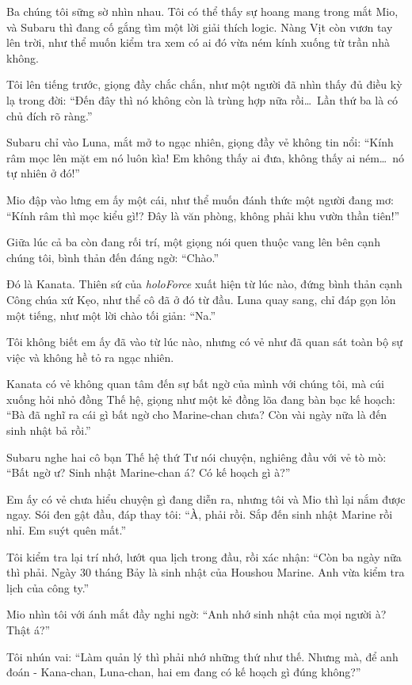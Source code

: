 \documentclass[../main.tex]{subfiles}
\begin{document}
Ba chúng tôi sững sờ nhìn nhau. Tôi có thể thấy sự hoang mang trong mắt Mio, và Subaru thì đang cố gắng tìm một lời giải thích logic. Nàng Vịt còn vươn tay lên trời, như thể muốn kiểm tra xem có ai đó vừa ném kính xuống từ trần nhà không.

Tôi lên tiếng trước, giọng đầy chắc chắn, như một người đã nhìn thấy đủ điều kỳ lạ trong đời: ``Đến đây thì nó không còn là trùng hợp nữa rồi\dots\ Lần thứ ba là có chủ đích rõ ràng.''

Subaru chỉ vào Luna, mắt mở to ngạc nhiên, giọng đầy vẻ không tin nổi: ``Kính râm mọc lên mặt em nó luôn kìa! Em không thấy ai đưa, không thấy ai ném\dots\ nó tự nhiên ở đó!''

Mio đập vào lưng em ấy một cái, như thể muốn đánh thức một người đang mơ: ``Kính râm thì mọc kiểu gì!? Đây là văn phòng, không phải khu vườn thần tiên!''

Giữa lúc cả ba còn đang rối trí, một giọng nói quen thuộc vang lên bên cạnh chúng tôi, bình thản đến đáng ngờ: ``Chào.''

Đó là Kanata. Thiên sứ của \textit{holoForce} xuất hiện từ lúc nào, đứng bình thản cạnh Công chúa xứ Kẹo, như thể cô đã ở đó từ đầu. Luna quay sang, chỉ đáp gọn lỏn một tiếng, như một lời chào tối giản: ``Na.''


Tôi không biết em ấy đã vào từ lúc nào, nhưng có vẻ như đã quan sát toàn bộ sự việc và không hề tỏ ra ngạc nhiên.

Kanata có vẻ không quan tâm đến sự bất ngờ của mình với chúng tôi, mà cúi xuống hỏi nhỏ đồng Thế hệ, giọng như một kẻ đồng lõa đang bàn bạc kế hoạch: ``Bà đã nghĩ ra cái gì bất ngờ cho Marine-chan chưa? Còn vài ngày nữa là đến sinh nhật bả rồi.''

Subaru nghe hai cô bạn Thế hệ thứ Tư nói chuyện, nghiêng đầu với vẻ tò mò: ``Bất ngờ ư? Sinh nhật Marine-chan á? Có kế hoạch gì à?''

Em ấy có vẻ chưa hiểu chuyện gì đang diễn ra, nhưng tôi và Mio thì lại nắm được ngay. Sói đen gật đầu, đáp thay tôi: ``À, phải rồi. Sắp đến sinh nhật Marine rồi nhỉ. Em suýt quên mất.''

Tôi kiểm tra lại trí nhớ, lướt qua lịch trong đầu, rồi xác nhận: ``Còn ba ngày nữa thì phải. Ngày 30 tháng Bảy là sinh nhật của Houshou Marine. Anh vừa kiểm tra lịch của công ty.''

Mio nhìn tôi với ánh mắt đầy nghi ngờ: ``Anh nhớ sinh nhật của mọi người à? Thật á?''

Tôi nhún vai: ``Làm quản lý thì phải nhớ những thứ như thế. Nhưng mà, để anh đoán - Kana-chan, Luna-chan, hai em đang có kế hoạch gì đúng không?''
\end{document}
